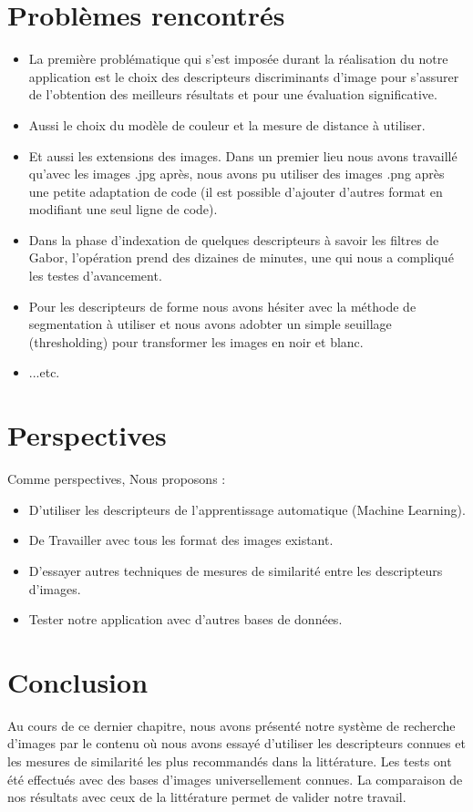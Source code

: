 \section{Problèmes rencontrés}
\begin{itemize}
	\item La première problématique qui s’est imposée durant la réalisation du notre
	application est le choix des descripteurs discriminants d’image pour s’assurer de
	l’obtention des meilleurs résultats et pour une évaluation significative.
	\item Aussi le choix du modèle de couleur et la mesure de distance à utiliser.
	
	\item Et aussi les extensions des images. Dans un premier lieu nous avons travaillé
	qu’avec les images .jpg après, nous avons pu utiliser des images .png après une
	petite adaptation de code (il est possible d'ajouter d'autres format en modifiant une seul ligne de code).
	
	\item Dans la phase d'indexation de quelques descripteurs à savoir les filtres de Gabor, l'opération prend des dizaines de minutes, une qui nous a compliqué les testes d'avancement.
	\item Pour les descripteurs de forme nous avons hésiter avec la méthode de segmentation à utiliser et nous avons adobter un simple seuillage (thresholding) pour transformer les images en noir et blanc.
	\item ...etc.
\end{itemize}
\section{Perspectives}
Comme perspectives, Nous proposons :
\begin{itemize}
	\item D’utiliser les descripteurs de l'apprentissage automatique (Machine Learning).
	
	\item De Travailler avec tous les format des images existant.
	\item D’essayer autres techniques de mesures de similarité entre les descripteurs
	d’images.
    \item Tester notre application avec d’autres bases de données.
\end{itemize}
\section{Conclusion}
Au cours de ce dernier chapitre, nous avons présenté notre système de recherche d’images par le contenu où nous avons essayé d’utiliser les descripteurs connues et les mesures de similarité les plus recommandés dans la littérature. Les tests ont été effectués avec des bases d’images universellement connues. La comparaison de nos résultats avec ceux de la littérature permet de valider notre travail.